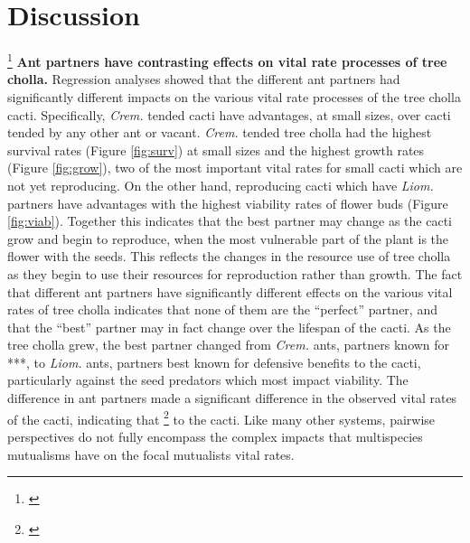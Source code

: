\documentclass[12pt,a4paper]{article}
\newcommand{\tom}[2]{{\color{red}{#1}}\footnote{\textit{\color{red}{#2}}}}
\begin{document}
		
		\section*{Discussion}
		\tom{\subsection*{Vital Rates}}{I don't think these are the right subsection headings because they are simply redescribing results.}
		\textbf{Ant partners have contrasting effects on vital rate processes of tree cholla.}
		Regression analyses showed that the different ant partners had significantly different impacts on the various vital rate processes of the tree cholla cacti. 
		Specifically, \textit{Crem.} tended cacti have advantages, at small sizes, over cacti tended by any other ant or vacant. 
		\textit{Crem.} tended tree cholla had the highest survival rates (Figure \ref{fig:surv})  at small sizes and the highest growth rates (Figure \ref{fig:grow}), two of the most important vital rates for small cacti which are not yet reproducing. 
		On the other hand, reproducing cacti which have \textit{Liom.} partners  have advantages with the highest viability rates of flower buds (Figure \ref{fig:viab}). 
		Together this indicates that the best partner may change as the cacti grow and begin to reproduce, when the most vulnerable part of the plant is the flower with the seeds. 
		This reflects the changes in the resource use of tree cholla as they begin to use their resources for reproduction rather than growth. 
		The fact that different ant partners have significantly different effects on the various vital rates of tree cholla indicates that none of them are the “perfect” partner, and that the “best” partner may in fact change over the lifespan of the cacti. 
		As the tree cholla grew, the best partner changed from \textit{Crem.} ants, partners known for ***, to \textit{Liom.} ants, partners best known for defensive benefits to the cacti, particularly against the seed predators which most impact viability. 
		The difference in ant partners made a significant difference in the observed vital rates of the cacti, indicating that \tom{considering the interaction between the tree cholla and any individual partner would fail to capture the extent of the benefits}{great point and well made -- I am going to stop commenting on the rest of the discussion because I think it needs to be re-worked. We can discuss more.} to the cacti.
		Like many other systems, pairwise perspectives do not fully encompass the complex impacts that multispecies mutualisms have on the focal mutualists vital rates.
		
\end{document}
